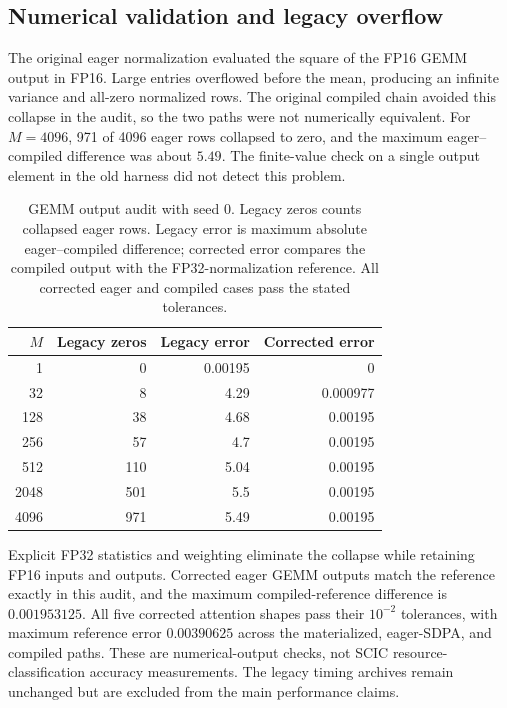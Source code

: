\documentclass[a4paper,fleqn]{cas-dc}
\begin{document}
\subsection{Numerical validation and legacy overflow}
\label{sec:numerics}

The original eager normalization evaluated the square of the FP16 GEMM output in FP16.
Large entries overflowed before the mean, producing an infinite variance and all-zero normalized rows.
The original compiled chain avoided this collapse in the audit, so the two paths were not numerically equivalent.
For $M{=}4096$, 971 of 4096 eager rows collapsed to zero, and the maximum eager--compiled difference was about $5.49$.
The finite-value check on a single output element in the old harness did not detect this problem.

\begin{table}[t]
  \centering
  \caption{GEMM output audit with seed 0.
  Legacy zeros counts collapsed eager rows.
  Legacy error is maximum absolute eager--compiled difference; corrected error compares the compiled output with the FP32-normalization reference.
  All corrected eager and compiled cases pass the stated tolerances.}
  \label{tab:numerics}
  \footnotesize
  \setlength{\tabcolsep}{3pt}
  \begin{tabular}{@{}rrrr@{}}
    \toprule
    $M$ & Legacy zeros & Legacy error & Corrected error \\
    \midrule
    1 & 0 & 0.00195 & 0 \\
    32 & 8 & 4.29 & 0.000977 \\
    128 & 38 & 4.68 & 0.00195 \\
    256 & 57 & 4.7 & 0.00195 \\
    512 & 110 & 5.04 & 0.00195 \\
    2048 & 501 & 5.5 & 0.00195 \\
    4096 & 971 & 5.49 & 0.00195 \\
    \bottomrule
  \end{tabular}
\end{table}

Explicit FP32 statistics and weighting eliminate the collapse while retaining FP16 inputs and outputs.
Corrected eager GEMM outputs match the reference exactly in this audit, and the maximum compiled-reference difference is $0.001953125$.
All five corrected attention shapes pass their $10^{-2}$ tolerances, with maximum reference error $0.00390625$ across the materialized, eager-SDPA, and compiled paths.
These are numerical-output checks, not SCIC resource-classification accuracy measurements.
The legacy timing archives remain unchanged but are excluded from the main performance claims.
\end{document}
